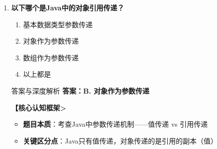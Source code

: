 \documentclass[12pt, a4paper]{ctexart}
\begin{document}
\begin{enumerate}[label=\textbf{\arabic*.}]
\begin{bluebox}{答案与深度解析}
\begin{itemize}[label={}, nosep]
		      \item \textbf{一个类只能创建一个对象 — 错误（可以创建多个）}
		      \begin{itemize}[label={}, nosep]
			      \item 类是模板，可以反复使用
			      \item 每次new都创建新对象
		      \end{itemize}

		      \item \textbf{对象是类的具体实例 — 正确（正确定义）}
		      \begin{itemize}[label={}, nosep]
			      \item 类：抽象的模板，定义属性和方法
			      \item 对象：类的具体实例，具有实际状态和行为
		      \end{itemize}
		      \end{itemize}

		      \textbf{【应背诵知识点>}
		      \begin{itemize}[label={}, nosep]
			      \item 类是抽象模板，对象是具体实例
			      \item 一个类可以创建多个对象
			      \item 对象拥有类的所有属性和行为
		      \end{itemize}

		      \textbf{【命题趋势与实战策略】}

		      \textbf{考场秒杀}：类=模板，对象=实例
	      \end{bluebox}

	      \vspace{1em}

	\item \textbf{以下哪个是Java中的对象引用传递？}
	      \begin{enumerate}[label=\Alph*.]
		      \item 基本数据类型参数传递
		      \item 对象作为参数传递
		      \item 数组作为参数传递
		      \item 以上都是
	      \end{enumerate}

	      \begin{bluebox}{答案与深度解析}
		      \textbf{答案：B. 对象作为参数传递}

		      \textbf{【核心认知框架>}
		      \begin{itemize}[label={}, leftmargin=*, nosep]
			      \item \textbf{题目本质}：考查Java中参数传递机制——值传递 vs 引用传递
			      \item \textbf{关键区分点}：Java只有值传递，对象传递的是引用的副本（值）
		      \end{itemize}


\end{bluebox}
\end{enumerate}
\end{document}

